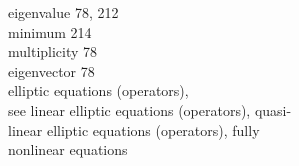 \begin{flushleft}
eigenvalue \hspace{1em} 78, 212\\
\hspace*{1.5em} minimum \hspace{1em} 214\\
\hspace*{1.5em} multiplicity \hspace{1em} 78\\
eigenvector \hspace{1em} 78\\
elliptic equations (operators),\\
\hspace*{1.5em} see linear elliptic equations (operators), quasi-\\
\hspace*{1.5em} linear elliptic equations (operators), fully\\
\hspace*{1.5em} nonlinear equations
\end{flushleft}

